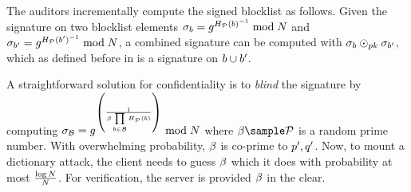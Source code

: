 The auditors incrementally compute the signed blocklist as follows. Given the signature on two 
blocklist elements $\genericSig[\genericBlocklistElmt] = 
\qrGen^{\primeRO(\genericBlocklistElmt)^{-1}} \bmod \rsaMod$ and 
$\genericSig[\genericBlocklistElmt'] = \qrGen^{\primeRO(\genericBlocklistElmt')^{-1}} \bmod 
\rsaMod$, a combined signature can be computed with $\genericSig[\genericBlocklistElmt] 
\sigHomomorphism[\pubKey] \genericSig[\genericBlocklistElmt']$, which as defined before in 
 is a signature on $\genericBlocklistElmt \cup 
\genericBlocklistElmt'$.  


%
A straightforward solution for confidentiality is to \textit{blind} the signature by computing 
$\genericSig[\blocklist] =  \qrGen^{\left(\frac{1}{\blindingFactor \blocklistAccSet}\right)} \bmod 
\rsaMod$ where $\blindingFactor \getsr \primes$ is a random prime number. With overwhelming 
probability, $\beta$ is co-prime to $\sgPrime[1],  
\sgPrime[2]$. Now, to mount a dictionary attack, the client needs to guess $\beta$
which it does with probability at most $\frac{\log N}{N}$. For verification, the server is 
provided $\beta$ in the clear. 
\fi
